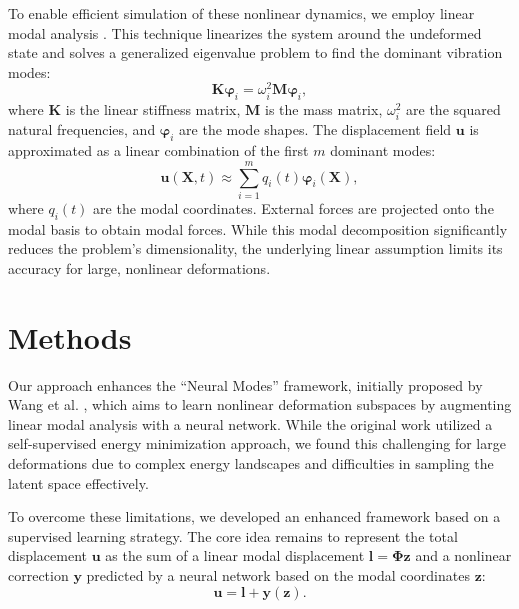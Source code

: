 \documentclass[11pt,a4paper,twocolumn]{article}
\renewcommand*{\phi}{\varphi}
\begin{document}
To enable efficient simulation of these nonlinear dynamics, we employ linear modal analysis \cite{Pentland_Williams_1989}. This technique linearizes the system around the undeformed state and solves a generalized eigenvalue problem to find the dominant vibration modes:
\begin{equation}
    \bm{K} \bm{\phi}_i = \omega_i^2 \bm{M} \bm{\phi}_i,
\label{eq:es:eigenvalue_problem}
\end{equation}
where $\bm{K}$ is the linear stiffness matrix, $\bm{M}$ is the mass matrix, $\omega_i^2$ are the squared natural frequencies, and $\bm{\phi}_i$ are the mode shapes. The displacement field $\bm{u}$ is approximated as a linear combination of the first $m$ dominant modes:
\begin{equation}
    \bm{u}(\bm{X},t) \approx \sum_{i=1}^{m} q_i(t) \bm{\phi}_i(\bm{X}),
\label{eq:es:modal_decomposition}
\end{equation}
where $q_i(t)$ are the modal coordinates. External forces are projected onto the modal basis to obtain modal forces. While this modal decomposition significantly reduces the problem's dimensionality, the underlying linear assumption limits its accuracy for large, nonlinear deformations.


\section{Methods}
\label{sec:es:methods}

Our approach enhances the ``Neural Modes'' framework, initially proposed by Wang et al. \cite{Wang_Du_Coros_Thomaszewski_2024}, which aims to learn nonlinear deformation subspaces by augmenting linear modal analysis with a neural network. While the original work utilized a self-supervised energy minimization approach, we found this challenging for large deformations due to complex energy landscapes and difficulties in sampling the latent space effectively.

To overcome these limitations, we developed an enhanced framework based on a supervised learning strategy. The core idea remains to represent the total displacement $\bm{u}$ as the sum of a linear modal displacement $\bm{l} = \bm{\Phi} \bm{z}$ and a nonlinear correction $\bm{y}$ predicted by a neural network based on the modal coordinates $\bm{z}$:
\begin{equation}
    \bm{u} = \bm{l} + \bm{y}(\bm{z}).
\label{eq:es:total_displacement_methods}
\end{equation}
\end{document}
